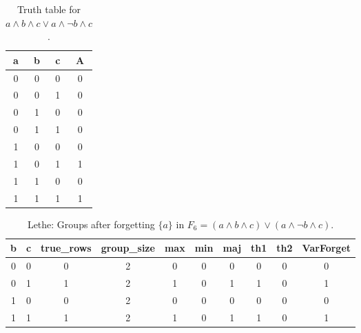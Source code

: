 \begin{table}[!tb]
    \centering
    \begin{tabular}{|c|c|c|c|}
        \hline
        \textbf{a} & \textbf{b} & \textbf{c} & \textbf{A} \\ \hline
        0 & 0 & 0 & 0 \\ \hline
        0 & 0 & 1 & 0 \\ \hline
        0 & 1 & 0 & 0 \\ \hline
        0 & 1 & 1 & 0 \\ \hline
        1 & 0 & 0 & 0 \\ \hline
        1 & 0 & 1 & 1 \\ \hline
        1 & 1 & 0 & 0 \\ \hline
        1 & 1 & 1 & 1 \\ \hline
    \end{tabular}
    \caption{Truth table for $a \land b \land c \lor a \land \lnot b \land c$.}
    \label{tab:truthtab}
\end{table}

\begin{table}[!tb]
    \centering
    \begin{tabular}{|c|c|c|c|c|c|c|c|c|c|}
        \hline
        \textbf{b} & \textbf{c} & \textbf{true\_rows} & \textbf{group\_size} & \textbf{max} & \textbf{min} & \textbf{maj} & \textbf{th1} & \textbf{th2} & \textbf{VarForget} \\ \hline
        \rowcolor{gray!40} 0 & 0 & 0 & 2 & 0 & 0 & 0 & 0 & 0 & 0 \\ \hline
        \rowcolor{blue!40} 0 & 1 & 1 & 2 & 1 & 0 & 1 & 1 & 0 & 1 \\ \hline
        \rowcolor{red!40} 1 & 0 & 0 & 2 & 0 & 0 & 0 & 0 & 0 & 0 \\ \hline
        \rowcolor{green!40} 1 & 1 & 1 & 2 & 1 & 0 & 1 & 1 & 0 & 1 \\ \hline
    \end{tabular}
    \caption{Lethe: Groups after forgetting $\{a\}$ in $F_{6} = (a \land b \land c) \lor (a \land \lnot b \land c)$.}
    \label{tab:lethe-F6-a-groups}
\end{table}
